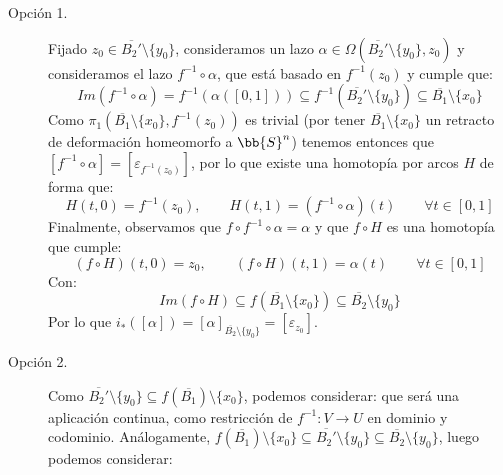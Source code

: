 \begin{ejercicio}
\begin{enumerate}[label=\alph*)]
            \begin{description}
                \item [Opción 1.] Fijado $z_0\in \overline{B_2'}\setminus \{y_0\}$, consideramos un lazo $\alpha\in \Omega(\overline{B_2'}\setminus \{y_0\}, z_0)$ y consideramos el lazo $f^{-1}\circ \alpha$, que está basado en $f^{-1}(z_0)$ y cumple que:
                    \begin{equation*}
                        Im(f^{-1}\circ \alpha)=f^{-1}(\alpha([0,1]))\subseteq f^{-1}(\overline{B_2'}\setminus \{y_0\}) \subseteq \overline{B_1}\setminus \{x_0\}
                    \end{equation*}
                    Como $\pi_1(\overline{B_1}\setminus\{x_0\},f^{-1}(z_0))$ es trivial (por tener $\overline{B_1}\setminus \{x_0\}$ un retracto de deformación homeomorfo a $\bb{S}^n$)  tenemos entonces que $[f^{-1}\circ \alpha] = [\varepsilon_{f^{-1}(z_0)}]$, por lo que existe una homotopía por arcos $H$ de forma que:
                    \begin{equation*}
                        H(t,0) = f^{-1}(z_0), \qquad H(t,1) = (f^{-1}\circ \alpha)(t) \qquad \forall t\in [0,1]
                    \end{equation*}
                    Finalmente, observamos que $f\circ f^{-1}\circ \alpha = \alpha$ y que $f\circ H$ es una homotopía que cumple:
                    \begin{equation*}
                        (f\circ H)(t,0) = z_0, \qquad (f\circ H)(t,1) = \alpha(t) \qquad \forall t\in [0,1]
                    \end{equation*}
                    Con:
                    \begin{equation*}
                        Im(f\circ H)\subseteq f(\overline{B_1}\setminus\{x_0\})\subseteq \overline{B_2}\setminus \{y_0\}
                    \end{equation*}
                    Por lo que $i_\ast([\alpha]) = [\alpha]_{\overline{B_2}\setminus \{y_0\}} = [\varepsilon_{z_0}]$.
                \item [Opción 2.] Como $\overline{B_2'}\setminus \{y_0\}\subseteq f(\overline{B_1})\setminus\{x_0\}$, podemos considerar:
                    que será una aplicación continua, como restricción de $f^{-1}:V\to U$ en dominio y codominio. Análogamente, $f(\overline{B_1})\setminus\{x_0\}\subseteq \overline{B_2'}\setminus\{y_0\}\subseteq \overline{B_2}\setminus\{y_0\}$, luego podemos considerar:

\end{description}
\end{enumerate}
\end{ejercicio}
